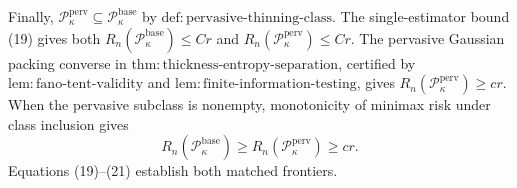 Finally, \(\mathcal P_{\kappa}^{\mathrm{perv}}\subseteq\mathcal P_{\kappa}^{\mathrm{base}}\) by \(\mathrm{def:pervasive\text{-}thinning\text{-}class}\). The single-estimator bound (19) gives both \(R_n(\mathcal P_{\kappa}^{\mathrm{base}})\le Cr\) and \(R_n(\mathcal P_{\kappa}^{\mathrm{perv}})\le Cr\). The pervasive Gaussian packing converse in \(\mathrm{thm:thickness\text{-}entropy\text{-}separation}\), certified by \(\mathrm{lem:fano\text{-}tent\text{-}validity}\) and \(\mathrm{lem:finite\text{-}information\text{-}testing}\), gives \(R_n(\mathcal P_{\kappa}^{\mathrm{perv}})\ge cr\). When the pervasive subclass is nonempty, monotonicity of minimax risk under class inclusion gives
\[
 R_n(\mathcal P_{\kappa}^{\mathrm{base}})
 \ge R_n(\mathcal P_{\kappa}^{\mathrm{perv}})\ge cr. \tag{21}
\]
Equations (19)--(21) establish both matched frontiers.
